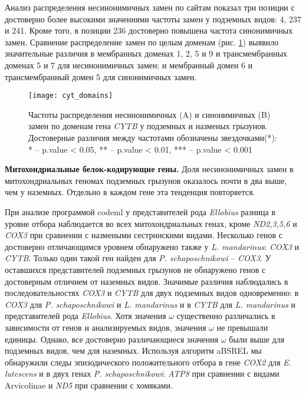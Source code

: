 Анализ распределения несинонимичных замен по сайтам показал три позиции с достоверно более высокими значениями частоты замен у подземных видов: 4, 237 и 241. Кроме того, в позиции 236 достоверно повышена частота синонимичных замен. Сравнение распределение замен по целым доменам (рис. \ref{Cyt_Dom_fig}) выявило значительные различия в мембранных доменах 1, 2, 5 и 9 и трансмембранных доменах 5 и 7 для несинонимичных замен; и мембранный домен 6 и трансмембранный домен 5 для синонимичных замен.

\begin{figure}[h!]
	\begin{center}
		\texttt{[image: cyt\_domains]}
	\end{center}
	\caption{Частоты распределения несинонимичных (A) и синонимичных (B) замен по доменам гена \textit{CYTB} у подземных и назменых грызунов. Достоверные различия между частотами обозначены звездочками(*): * -- p.value < 0.05, ** -- p.value < 0.01, *** -- p.value < 0.001 }\label{Cyt_Dom_fig}
\end{figure} 

\textbf{Митохондриальные белок-кодирующие гены.} 
Доля несинонимичных замен в митохондриальных геномах подземных грызунов оказалось почти в два выше, чем у наземных. Отдельно в каждом гене эта тенденция повторяется.

При анализе программой codeml у представителей рода \textit{Ellobius} разница в уровне отбора наблюдается во всех митохондриальных генах, кроме \textit{ND2,3,5,6} и \textit{COX3} при сравнении с назмеными сестринскими видами. Несколько генов с достоверно отличающимся уровнем обнаружено также у \textit{L. mandarinus}: \textit{COX3} и \textit{CYTB}. Только один такой ген найден для \textit{P. schaposchnikowi} -- \textit{COX3}. У оставшихся представителей подземных грызунов не обнаружено генов с достоверным отличием от наземных видов. Значимые различия наблюдались в последовательностях \textit{COX3} и \textit{CYTB} для двух подземных видов одновременно: в \textit{COX3} для \textit{P. schaposchnikowi} и \textit{L. mandarinus} и в \textit{CYTB} для \textit{L. mandarinus} и представителей рода \textit{Ellobius}. Хотя значения $\omega$ существенно различались в зависимости от генов и анализируемых видов, значения $\omega$ не превышали единицы. Однако, все достоверно различающиеся значения $\omega$ были выше для подземных видов, чем для наземных. Используя алгоритм aBSREL мы обнаружили следы эпизодического положительного отбора в гене \textit{COX2} для \textit{E. lutescens} и в двух генах \textit{P. schaposchnikowi}: \textit{ATP8} при сравнении с видами Arvicolinae и \textit{ND5} при сравнении с хомяками. 

